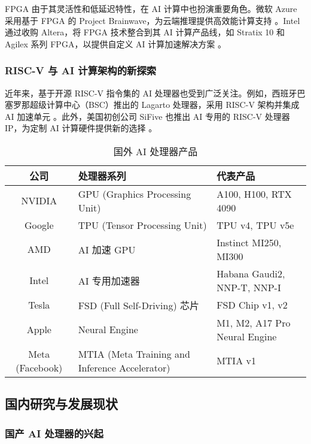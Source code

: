 FPGA 由于其灵活性和低延迟特性，在 AI 计算中也扮演重要角色。微软 Azure 采用基于 FPGA 的 Project Brainwave，为云端推理提供高效能计算支持 \cite{microsoft2019brainwave}。Intel 通过收购 Altera，将 FPGA 技术整合到其 AI 计算产品线，如 Stratix 10 和 Agilex 系列 FPGA，以提供自定义 AI 计算加速解决方案 \cite{intel2020agilex}。

\subsubsection{RISC-V 与 AI 计算架构的新探索}

近年来，基于开源 RISC-V 指令集的 AI 处理器也受到广泛关注。例如，西班牙巴塞罗那超级计算中心（BSC）推出的 Lagarto 处理器，采用 RISC-V 架构并集成 AI 加速单元 \cite{aschermann2021risc}。此外，美国初创公司 SiFive 也推出 AI 专用的 RISC-V 处理器 IP，为定制 AI 计算硬件提供新的选择 \cite{sifive2021ai}。
\begin{table}
    \centering
    \caption{国外 AI 处理器产品}
    \label{tab:ai_chips}
    \begin{tabular}{cll} %
      \toprule
      公司   & 处理器系列                                       & 代表产品                          \\
      \midrule
      {NVIDIA} & GPU (Graphics Processing Unit) & A100, H100, RTX 4090 \\ 
      {Google} & TPU (Tensor Processing Unit) & TPU v4, TPU v5e \\ 
      {AMD} & AI 加速 GPU & Instinct MI250, MI300 \\ 
      {Intel} & AI 专用加速器 & Habana Gaudi2, NNP-T, NNP-I \\ 
      {Tesla} & FSD (Full Self-Driving) 芯片 & FSD Chip v1, v2 \\ 
      {Apple} & Neural Engine & M1, M2, A17 Pro Neural Engine \\ 
      {Meta (Facebook)} & MTIA (Meta Training and Inference Accelerator) & MTIA v1 \\
  
      \bottomrule
    \end{tabular}
\end{table}


\subsection{国内研究与发展现状}

\subsubsection{国产 AI 处理器的兴起}

